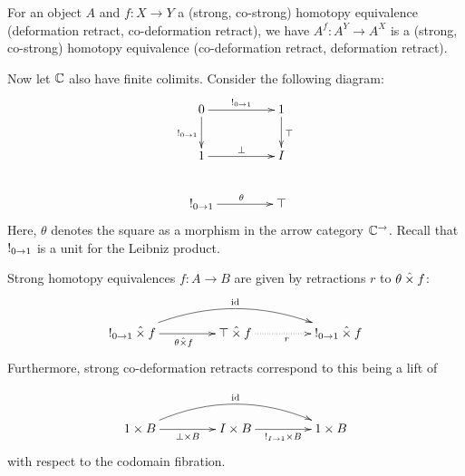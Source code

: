 \documentclass[reqno,10pt,a4paper,oneside]{amsart}
\begin{document}
\begin{remark}
\label{h-equiv-exponent}
For an object $A$ and $f : X \to Y$ a (strong, co-strong) homotopy equivalence (deformation retract, co-deformation retract), we have $A^f : A^Y \to A^X$ is a (strong, co-strong) homotopy equivalence (co-deformation retract, deformation retract).
\end{remark}

\begin{comment}
\begin{example}
\label{de-morgan-exp-deformation-retract}
Let $I$ have the structure of a De Morgan algebra in $\catC$.
For any object $A$, the section-retraction pair $A^{\canonical_{I \to 1}} : A^1 \to A^I$ and $A^{\top} : A^I \to A^1$ forms a strong and co-strong deformation retract.
The same holds with $\top$ replaced by $\bot$.
\end{example}

\begin{proof}
Combine \cref{de-morgan-deformation-retract} with \cref{h-equiv-exponent}.
\end{proof}
\end{comment}

Now let $\mathbb{C}$ also have finite colimits.
Consider the following diagram:
\[
\xymatrix@C+2em{
  0
  \ar[r]^{\canonical_{0 \to 1}}
  \ar[d]_{\canonical_{0 \to 1}}
&
  1
  \ar[d]^{\top}
\\
  1
  \ar[r]^{\bot}
&
  I
\\
  \canonical_{0 \to 1}
  \ar[r]^{\theta}
&
  \top
}
\]
Here, $\theta$ denotes the square as a morphism in the arrow category $\mathbb{C}^{\to}$.
Recall that $\mathord{!}_{0 \to 1}$ is a unit for the Leibniz product. 

\begin{lemma}
\label{strong-h-equiv-as-retraction}
Strong homotopy equivalences $f : A \to B$ are given by retractions $r$ to $\theta \mathbin{\hat{\times}} f$:
\[
\xymatrix@C+2em{
  \canonical_{0 \to 1} \hattimes f
  \ar[r]_{\theta \hattimes f}
  \ar@/^2em/[rr]^{\id}
&
  \top \hattimes f
  \ar@{.>}[r]_{r}
&
  \canonical_{0 \to 1} \hattimes f
}
\]
Furthermore, strong co-deformation retracts correspond to this being a lift of

\[
\xymatrix@C+2em{
  1 \times B
  \ar[r]_{\bot \times B}
  \ar@/^2em/[rr]^{\id}
&
  I \times B
  \ar[r]_{\canonical_{I \to 1} \times B}
&
  1 \times B
}
\]
with respect to the codomain fibration.
\end{lemma}
\end{document}

